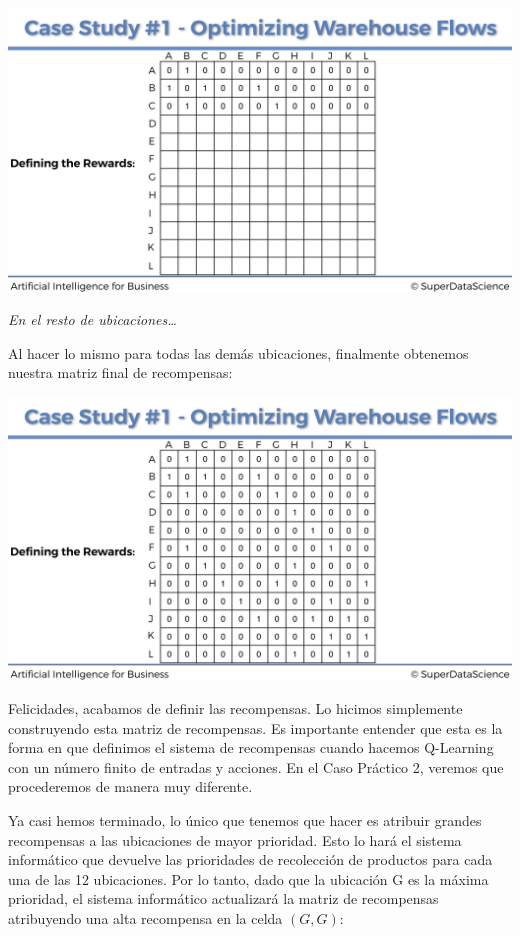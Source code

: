\documentclass[]{book}
\begin{document}
\includegraphics{Images/Rewards_Matrix_3.png}

\emph{En el resto de ubicaciones\ldots{}}

Al hacer lo mismo para todas las demás ubicaciones, finalmente obtenemos nuestra matriz final de recompensas:

\includegraphics{Images/Rewards_Matrix_4.png}

Felicidades, acabamos de definir las recompensas. Lo hicimos simplemente construyendo esta matriz de recompensas. Es importante entender que esta es la forma en que definimos el sistema de recompensas cuando hacemos Q-Learning con un número finito de entradas y acciones. En el Caso Práctico 2, veremos que procederemos de manera muy diferente.

Ya casi hemos terminado, lo único que tenemos que hacer es atribuir grandes recompensas a las ubicaciones de mayor prioridad. Esto lo hará el sistema informático que devuelve las prioridades de recolección de productos para cada una de las 12 ubicaciones. Por lo tanto, dado que la ubicación G es la máxima prioridad, el sistema informático actualizará la matriz de recompensas atribuyendo una alta recompensa en la celda \((G, G)\):
\end{document}
